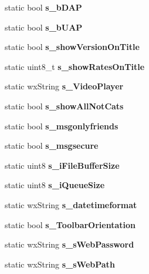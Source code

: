 \begin{DoxyCompactItemize}
\item 
static bool {\bfseries s\_\-bDAP}\label{classCPreferences_ac6e8aa20efc517b037a656f9126b84fe}

\item 
static bool {\bfseries s\_\-bUAP}\label{classCPreferences_a7d70585115a5800af93bfa0aea060980}

\item 
static bool {\bfseries s\_\-showVersionOnTitle}\label{classCPreferences_a53f9474e58666db5515723977f19021b}

\item 
static uint8\_\-t {\bfseries s\_\-showRatesOnTitle}\label{classCPreferences_a2b4b8b2fb50b7b977106cc40ab814b2b}

\item 
static wxString {\bfseries s\_\-VideoPlayer}\label{classCPreferences_af1a8cf1e3d8ba463faa8b064cc09248b}

\item 
static bool {\bfseries s\_\-showAllNotCats}\label{classCPreferences_a287f88a7149c77a6b0cfe30b1a9e0416}

\item 
static bool {\bfseries s\_\-msgonlyfriends}\label{classCPreferences_ae64d29da7e9ae41efd3be9474e67be1b}

\item 
static bool {\bfseries s\_\-msgsecure}\label{classCPreferences_a307ee849b8f77a547758f3bdf5e5fee8}

\item 
static uint8 {\bfseries s\_\-iFileBufferSize}\label{classCPreferences_a4f54ef4e3048b9dc1e3652efc98eddba}

\item 
static uint8 {\bfseries s\_\-iQueueSize}\label{classCPreferences_a9121357e68509606361d523a7ee1e0d6}

\item 
static wxString {\bfseries s\_\-datetimeformat}\label{classCPreferences_a41ce343e4dde331d91fa4d27ecaa32cc}

\item 
static bool {\bfseries s\_\-ToolbarOrientation}\label{classCPreferences_a63c22576f54b21885d7a9bb9b25c9de9}

\item 
static wxString {\bfseries s\_\-sWebPassword}\label{classCPreferences_a8024c1cb4f5ac2412603aaf174764bed}

\item 
static wxString {\bfseries s\_\-sWebPath}\label{classCPreferences_ab7085b6aff610513ec744de69a675ed6}


\end{DoxyCompactItemize}
